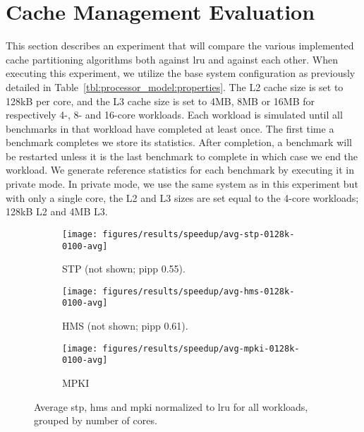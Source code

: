 
\section{Cache Management Evaluation}
\label{sec:results:cache_partition}

This section describes an experiment that will compare the various implemented cache partitioning algorithms both against \gls{lru} and against each other.
When executing this experiment, we utilize the base system configuration as previously detailed in Table~\ref{tbl:processor_model:properties}.
The L2 cache size is set to 128kB per core, and the L3 cache size is set to 4MB, 8MB or 16MB for respectively 4-, 8- and 16-core workloads.
Each workload is simulated until all benchmarks in that workload have completed at least once. 
The first time a benchmark completes we store its statistics.
After completion, a benchmark will be restarted unless it is the last benchmark to complete in which case we end the workload.
We generate reference statistics for each benchmark by executing it in private mode.
In private mode, we use the same system as in this experiment but with only a single core, the L2 and L3 sizes are set equal to the 4-core workloads; 128kB L2 and 4MB L3.

\begin{figure}[th]
    \centering
    \begin{subfigure}[b]{0.5\textwidth}
        \texttt{[image: figures/results/speedup/avg-stp-0128k-0100-avg]}
        \caption{STP (not shown; \gls{pipp} 0.55).}
        \label{fig:results:base:avg:stp}
    \end{subfigure}%
    \begin{subfigure}[b]{0.5\textwidth}
        \texttt{[image: figures/results/speedup/avg-hms-0128k-0100-avg]}
        \caption{HMS (not shown; \gls{pipp} 0.61).}
        \label{fig:results:base:avg:hms}
    \end{subfigure}
    \begin{subfigure}[b]{0.5\textwidth}
        \texttt{[image: figures/results/speedup/avg-mpki-0128k-0100-avg]}
        \caption{MPKI}
        \label{fig:results:base:avg:mpki}
    \end{subfigure}
    \caption[Average result grouped by core]{Average \gls{stp}, \gls{hms} and \gls{mpki} normalized to \gls{lru} for all workloads, grouped by number of cores.}
    \label{fig:results:base:avg}
\end{figure}



